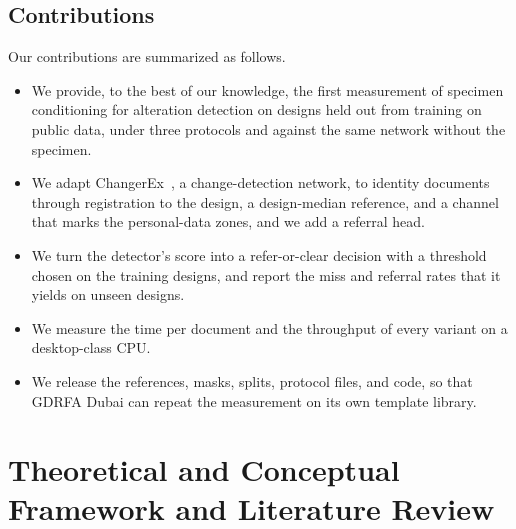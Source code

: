 \documentclass[12pt,a4paper]{article}
\newif\ifshowguidance
\newcommand{\todo}[1]{\ifshowguidance\leavevmode{\color{gray}\itshape [#1]}\fi}
\begin{document}
\subsection{Contributions}
Our contributions are summarized as follows.
\begin{itemize}
  \item We provide, to the best of our knowledge, the first measurement of specimen conditioning for alteration detection on designs held out from training on public data, under three protocols and against the same network without the specimen.
  \item We adapt ChangerEx~\cite{fang2023changer}, a change-detection network, to identity documents through registration to the design, a design-median reference, and a channel that marks the personal-data zones, and we add a referral head.
  \item We turn the detector's score into a refer-or-clear decision with a threshold chosen on the training designs, and report the miss and referral rates that it yields on unseen designs.
  \item We measure the time per document and the throughput of every variant on a desktop-class CPU.
  \item We release the references, masks, splits, protocol files, and code, so that GDRFA Dubai can repeat the measurement on its own template library.
\end{itemize}
\todo{Suggestion (11 Oct). Consider a contribution on the compression cue, namely that the released SIDTD models reach their published results through the JPEG quality of the files, which reveals the label, whereas the reference-conditioned detector responds to the alteration rather than to the compression (Section~\ref{sec:results}). The first contribution still holds as written, since its three protocols are the ones on held-out designs (B to D).}


\section{Theoretical and Conceptual Framework and Literature Review}
\label{sec:framework}
\end{document}
